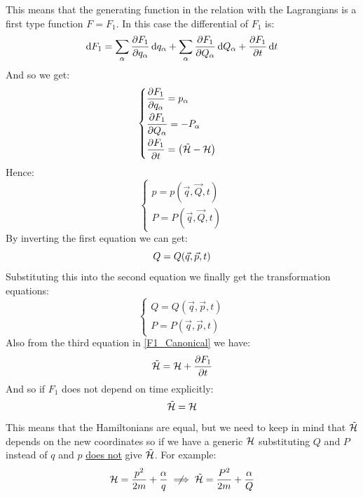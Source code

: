 This means that the generating function in the relation with the Lagrangians is a first type function $F = F_1$. In this case the differential of $F_1$ is:
\begin{equation}
    \dd{F_1} = \bigsum_{\alpha} \pdv{F_1}{q_{\alpha}} \dd{q_{\alpha}} + \bigsum_{\alpha} \pdv{F_1}{Q_{\alpha}} \dd{Q_{\alpha}} + \pdv{F_1}{t} \dd{t}
\end{equation}
And so we get:
\begin{equation} \label{F1_Canonical}
    \begin{cases}
        \pdv{F_1}{q_{\alpha}} = p_{\alpha}\\[8pt]
        \pdv{F_1}{Q_{\alpha}} = -P_{\alpha}\\[8pt]
        \pdv{F_1}{t} = \brackets{\tilde{\hamfun}- \hamfun}
    \end{cases}
\end{equation}
Hence:
\begin{equation}
    \begin{cases}
        p = p(\vec{q},\vec{Q},t)\\
        P = P(\vec{q},\vec{Q},t)
    \end{cases}
\end{equation}
By inverting the first equation we can get:
\begin{equation}
    Q = Q(\vec{q},\vec{p},t)\\
\end{equation}
Substituting this into the second equation we finally get the transformation equations:
\begin{equation}
    \begin{cases}
        Q = Q(\vec{q},\vec{p},t)\\
        P = P(\vec{q},\vec{p},t)
    \end{cases}
\end{equation}
Also from the third equation in \eqref{F1_Canonical} we have:
\begin{equation}
    \tilde{\hamfun} = \hamfun + \pdv{F_1}{t}
\end{equation}
And so if $F_1$ does not depend on time explicitly:
\begin{equation}
    \tilde{\mathcal{H}} = \mathcal{H}
\end{equation}
This means that the Hamiltonians are equal, but we need to keep in mind that $\tilde{\mathcal{H}}$ depends on the new coordinates so if we have a generic $\mathcal{H}$ substituting $Q$ and $P$ instead of $q$ and $p$ \underline{does not} give $\tilde{\mathcal{H}}$. For example:
\begin{equation}
    \hamfun = \dfrac{p^2}{2m} + \dfrac{\alpha}{q} \notimplies \tilde{\hamfun} = \dfrac{P^2}{2m} + \dfrac{\alpha}{Q}
\end{equation}
